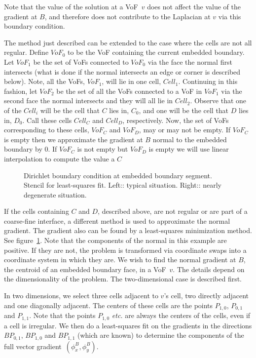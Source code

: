 Note that the value of the solution at a VoF~$v$ does not affect the
value of the gradient at $B$, and therefore does not contribute to the
Laplacian at $v$ via this boundary condition.

The method just described can be extended to the case where the cells are
not all regular.  Define ${VoF}_0$ to be the VoF containing the current
embedded boundary.  Let ${VoF}_1$ be the set of VoFs connected to ${VoF}_0$
via the face the normal first intersects (what is done if the normal
intersects an edge or corner is described below).  Note, all the VoFs,
${VoF}_1$, will lie in one cell, ${Cell}_1$.  Continuing in this fashion, let
${VoF}_2$ be the set of all the VoFs connected to a VoF in ${VoF}_1$ via the
second face the normal intersects and they will all lie in ${Cell}_2$.
Observe that one of the ${Cell}_i$ will be the cell that $C$ lies in, $C_0$,
and one will be the cell that $D$ lies in, $D_0$.  Call these cells ${Cell}_C$
and ${Cell}_D$, respectively.  Now, the set of VoFs corresponding to these
cells, ${VoF}_C$ and ${VoF}_D$, may or may not be empty.  If ${VoF}_C$ is
empty then we approximate the gradient at $B$ normal to the embedded boundary
by 0.  If ${VoF}_C$ is not empty but ${VoF}_D$ is empty we will use linear
interpolation to compute the value a $C$

 \begin{figure}
 \epsfxsize=3.0in
 \hspace{1.0in} 
 \caption{Dirichlet boundary condition at embedded boundary segment.
 Stencil for least-squares fit.  Left:: typical situation.  Right::
 nearly degenerate situation.}
 \label{fig::ebdirbc2}
 \end{figure}
 
 If the cells containing $C$ and $D$, described above, are not regular
 or are part of a coarse-fine interface, a
 different method is used to approximate the normal gradient.  The
 gradient also can be found by a least-squares minimization method.
 See figure~\ref{fig::ebdirbc2}.  Note that the components of the normal
 in this example are positive.  If they are not, the problem is
 transformed via coordinate swaps into a coordinate system in which
 they are.  We wish to find the normal gradient at $B$, the
 centroid of an embedded boundary face, in a VoF~$v$.  The details
 depend on the dimensionality of the problem.  The two-dimensional case
 is described first.
 
 In two dimensions, we select three cells adjacent to $v$'s cell, two
 directly adjacent and one diagonally adjacent.  The centers of these
 cells are the points $P_{1,0}$, $P_{0,1}$ and $P_{1,1}$.  Note that
 the points $P_{1,0}$ {\em etc.} are always the centers of the cells,
 even if a cell is irregular.  We then do a least-squares fit on the
 gradients in the directions $B\!P_{0,1}$, $B\!P_{1,0}$
 and $B\!P_{1,1}$ (which are known) to determine the components of the
 full vector gradient~$(\phi_x^B,\phi_y^B)$.
 
